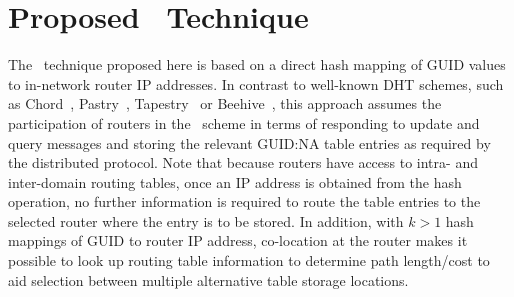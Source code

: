 \section{Proposed \arcName~Technique}
\label{sec:design}
    The \arcName~technique proposed here is based on a direct hash mapping of GUID values to in-network router IP addresses.  In contrast to well-known DHT schemes, such as Chord~\cite{chord_stoica}, Pastry~\cite{pastry_Rowstron}, Tapestry~\cite{tapestry_Zhao} or Beehive~\cite{Beehive_Ramasubramanian}, this approach assumes the participation of routers in the \arcName~scheme in terms of responding to update and query messages and storing the relevant GUID:NA table entries as required by the distributed protocol. Note that because routers have access to intra- and inter-domain routing tables, once an IP address is obtained from the hash operation, no further information is required to route the table entries to the selected router where the entry is to be stored.  In addition, with $k>1$ hash mappings of GUID to router IP address, co-location at the router makes it possible to look up routing table information to determine path length/cost to aid selection between multiple alternative table storage locations. 
